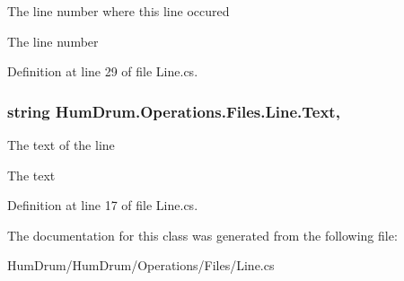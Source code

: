 The line number where this line occured 

The line number

Definition at line 29 of file Line.\+cs.

\hypertarget{classHumDrum_1_1Operations_1_1Files_1_1Line_a885daada20e09b8b049b1804b0b44005}{}
\subsubsection[{Text}]{\setlength{\rightskip}{0pt plus 5cm}string Hum\+Drum.\+Operations.\+Files.\+Line.\+Text\hspace{0.3cm}{\ttfamily [get]}, {\ttfamily [set]}}\label{classHumDrum_1_1Operations_1_1Files_1_1Line_a885daada20e09b8b049b1804b0b44005}


The text of the line 

The text

Definition at line 17 of file Line.\+cs.



The documentation for this class was generated from the following file\+:\begin{DoxyCompactItemize}
\item 
Hum\+Drum/\+Hum\+Drum/\+Operations/\+Files/Line.\+cs\end{DoxyCompactItemize}
